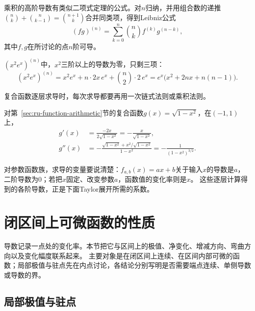 乘积的高阶导数有类似二项式定理的公式。对$n$归纳，并用组合数的递推$\binom nk+\binom n{k-1}=\binom{n+1}k$合并同类项，得到Leibniz公式
\[
 (fg)^{(n)}=\sum_{k=0}^n\binom nkf^{(k)}g^{(n-k)},
\]
其中$f,g$在所讨论的点$n$阶可导。
\begin{example}[用Leibniz公式求$(x^2e^x)^{(n)}$]
\label{ex:ru-leibniz-x2-exp}
$(x^2e^x)^{(n)}$中，$x^2$三阶以上的导数为零，只剩三项：
\[
 (x^2e^x)^{(n)}=x^2e^x+n\cdot2x\,e^x+\binom n2\cdot2\,e^x=e^x\bigl(x^2+2nx+n(n-1)\bigr).
\]
\end{example}

复合函数逐层求导时，每次求导都要再用一次链式法则或乘积法则。
\begin{example}
\label{ex:ru-sqrt-second-derivative}
对第~\ref{sec:ru-function-arithmetic}节的复合函数$g(x)=\sqrt{1-x^2}$，在$(-1,1)$上，
\begin{align*}
 g'(x)&=\frac{-2x}{2\sqrt{1-x^2}}=-\frac x{\sqrt{1-x^2}},\\
 g''(x)&=-\frac{\sqrt{1-x^2}+x^2/\sqrt{1-x^2}}{1-x^2}=-\frac1{(1-x^2)^{3/2}}.
\end{align*}
\end{example}
对参数函数族，求导的变量要说清楚：$f_{a,b}(x)=ax+b$关于输入$x$的导数是$a$，二阶导数为$0$；若把$x$固定、改变参数$a$，函数值的变化率则是$x$。
这些逐层计算得到的各阶导数，正是下面Taylor展开所需的系数。
\section{闭区间上可微函数的性质}
\label{sec:ru-interval-differentiable}

导数记录一点处的变化率。本节把它与区间上的极值、净变化、增减方向、弯曲方向以及变化幅度联系起来。
主要对象是在闭区间上连续、在区间内部可微的函数；局部极值与驻点先在内点讨论，各结论分别写明是否需要端点连续、单侧导数或导数的界。

\subsection{局部极值与驻点}
\label{sec:ru-local-extrema}

